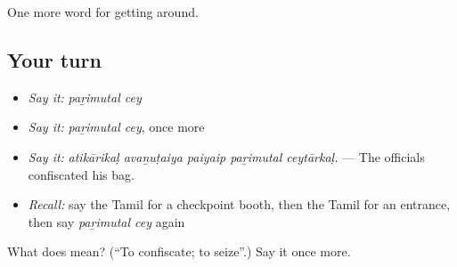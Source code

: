 \begin{grammarlens}[title={What you've built}]
One more word for getting around.
\end{grammarlens}

\subsection*{Your turn}
\begin{itemize}
\raggedright
  \item \emph{Say it:} \emph{paṟimutal cey}
  \item \emph{Say it:} \emph{paṟimutal cey}, once more
  \item \emph{Say it:} \emph{atikārikaḷ avaṉuṭaiya paiyaip paṟimutal ceytārkaḷ.} — The officials confiscated his bag.
  \item \emph{Recall:} say the Tamil for a checkpoint booth, then the Tamil for an entrance, then say \emph{paṟimutal cey} again
\end{itemize}

\begin{tcolorbox}[breakable,colback=teal!4,colframe=teal!35!black,title={Before you move on}]
What does   mean? (\textquotedblleft{}To confiscate; to seize\textquotedblright{}.) Say it once more.
\end{tcolorbox}
